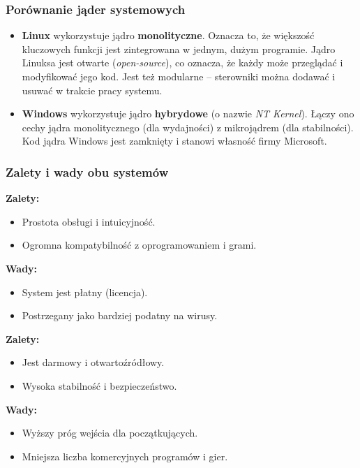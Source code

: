 \subsubsection{Porównanie jąder systemowych}
\begin{itemize}
    \item \textbf{Linux} wykorzystuje jądro \textbf{monolityczne}. Oznacza to, że większość kluczowych funkcji jest zintegrowana w jednym, dużym programie. Jądro Linuksa jest otwarte (\textit{open-source}), co oznacza, że każdy może przeglądać i modyfikować jego kod. Jest też modularne -- sterowniki można dodawać i usuwać w trakcie pracy systemu.
    \item \textbf{Windows} wykorzystuje jądro \textbf{hybrydowe} (o nazwie \textit{NT Kernel}). Łączy ono cechy jądra monolitycznego (dla wydajności) z mikrojądrem (dla stabilności). Kod jądra Windows jest zamknięty i stanowi własność firmy Microsoft.
\end{itemize}

\subsubsection{Zalety i wady obu systemów}
\begin{tcbitemize}[raster columns=2, raster equal height, colback=black!5, colframe=titlebg, fonttitle=\bfseries]
    \tcbitem[title=Windows]
        \textbf{Zalety:}
        \begin{itemize}
            \item Prostota obsługi i intuicyjność.
            \item Ogromna kompatybilność z oprogramowaniem i grami.
        \end{itemize}
        \textbf{Wady:}
        \begin{itemize}
            \item System jest płatny (licencja).
            \item Postrzegany jako bardziej podatny na wirusy.
        \end{itemize}
    \tcbitem[title=Linux]
        \textbf{Zalety:}
        \begin{itemize}
            \item Jest darmowy i otwartoźródłowy.
            \item Wysoka stabilność i bezpieczeństwo.
        \end{itemize}
        \textbf{Wady:}
        \begin{itemize}
            \item Wyższy próg wejścia dla początkujących.
            \item Mniejsza liczba komercyjnych programów i gier.
        \end{itemize}
\end{tcbitemize}


